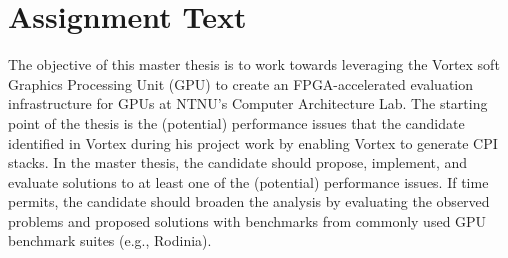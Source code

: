 \chapter*{Assignment Text}\label{chap:assignment}

The objective of this master thesis is to work towards leveraging the Vortex soft Graphics Processing Unit (GPU) to create an FPGA-accelerated evaluation infrastructure for GPUs at NTNU’s Computer Architecture Lab. The starting point of the thesis is the (potential) performance issues that the candidate identified in Vortex during his project work by enabling Vortex to generate CPI stacks. In the master thesis, the candidate should propose, implement, and evaluate solutions to at least one of the (potential) performance issues. If time permits, the candidate should broaden the analysis by evaluating the observed problems and proposed solutions with benchmarks from commonly used GPU benchmark suites (e.g., Rodinia).